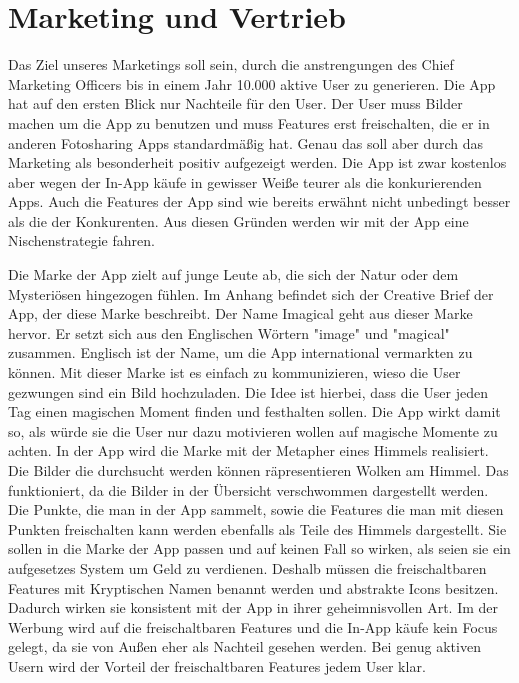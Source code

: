 \chapter{Marketing und Vertrieb}
Das Ziel unseres Marketings soll sein, durch die anstrengungen des Chief Marketing Officers bis in einem Jahr 10.000 aktive User zu generieren.
Die App hat auf den ersten Blick nur Nachteile für den User. Der User muss Bilder machen um die App zu benutzen und muss Features erst freischalten, die er in anderen Fotosharing Apps standardmäßig hat. Genau das soll aber durch das Marketing als besonderheit positiv aufgezeigt werden.
Die App ist zwar kostenlos aber wegen der In-App käufe in gewisser Weiße teurer als die konkurierenden Apps. Auch die Features der App sind wie bereits erwähnt nicht unbedingt besser als die der Konkurenten. Aus diesen Gründen werden wir mit der App eine Nischenstrategie fahren.

Die Marke der App zielt auf junge Leute ab, die sich der Natur oder dem Mysteriösen hingezogen fühlen. Im Anhang befindet sich der Creative Brief der App, der diese Marke beschreibt.
Der Name Imagical geht aus dieser Marke hervor. Er setzt sich aus den Englischen Wörtern "image" und "magical" zusammen. Englisch ist der Name, um die App international vermarkten zu können.
Mit dieser Marke ist es einfach zu kommunizieren, wieso die User gezwungen sind ein Bild hochzuladen. Die Idee ist hierbei, dass die User jeden Tag einen magischen Moment finden und festhalten sollen. Die App wirkt damit so, als würde sie die User nur dazu motivieren wollen auf magische Momente zu achten.
In der App wird die Marke mit der Metapher eines Himmels realisiert. Die Bilder die durchsucht werden können räpresentieren Wolken am Himmel. Das funktioniert, da die Bilder in der Übersicht verschwommen dargestellt werden. Die Punkte, die man in der App sammelt, sowie die Features die man mit diesen Punkten freischalten kann werden ebenfalls als Teile des Himmels dargestellt. Sie sollen in die Marke der App passen und auf keinen Fall so wirken, als seien sie ein aufgesetzes System um Geld zu verdienen. Deshalb müssen die freischaltbaren Features mit Kryptischen Namen benannt werden und abstrakte Icons besitzen. Dadurch wirken sie konsistent mit der App in ihrer geheimnisvollen Art.
Im der Werbung wird auf die freischaltbaren Features und die In-App käufe kein Focus gelegt, da sie von Außen eher als Nachteil gesehen werden. Bei genug aktiven Usern wird der Vorteil der freischaltbaren Features jedem User klar.